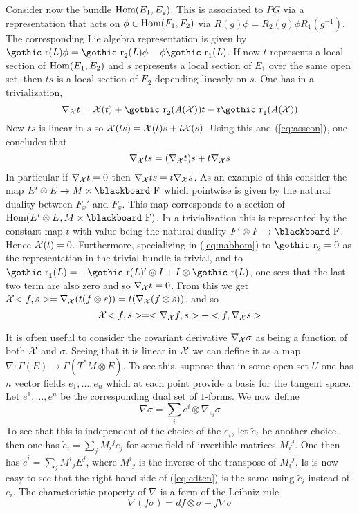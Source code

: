\documentclass[12pt,titlepage]{article}
\def\bbf#1{\hbox{\blackboard #1}}
\def\goth#1{\hbox{\gothic #1}}
\def\lF{\bbf F}
\def\cX{{\cal X}}
\def\gr{{\goth r}}
\def\Hom{\hbox{Hom}}
\begin{document}
Consider now the bundle \(\Hom(E_1,E_2)\). This is associated to \(PG\)
via a representation that acts on \(\phi\in\Hom(F_1,F_2)\) via
\(R(g)\phi = R_2(g)\phi R_1(g^{-1})\). The corresponding Lie algebra
representation is given by \(\gr(L)\phi = \gr_2(L)\phi - \phi\gr_1(L)\).
If now \(t\) represents a local section of \(\Hom(E_1,E_2)\) and \(s\)
represents a local section of \(E_1\) over the same open set, then
\(ts\) is a local section of \(E_2\) depending linearly on \(s\).
One has in a  trivialization,
\begin{equation}\label{eq:nabhom}%
\nabla_\cX t=\cX(t)+ \gr_2(A (\cX))t-t\gr_1(A (\cX))
\end{equation}%
Now
\(ts\) is linear in \(s\) so \(\cX(ts)=\cX(t)s + t\cX(s)\).
Using this and (\ref{eq:asscon}), one concludes that
\begin{equation}\label{eq:cdts}
\nabla_\cX ts =(\nabla_\cX t)s+t\nabla_\cX s
\end{equation}
In particular if
\(\nabla_\cX t=0\)
then \(\nabla_\cX ts = t\nabla_\cX s\).  As an example of this consider
the map \(E'\otimes E \to M\times \lF\) which pointwise is given by the
natural duality between \(F_x'\) and \(F_x\). This map corresponds to a
section of \(\Hom(E'\otimes E, M\times \lF)\). In a 
trivialization this is represented by the constant map \(t\)
with value being the natural duality \(F'\otimes F\to \lF\). Hence
\(\cX(t)=0\). Furthermore, specializing in (\ref{eq:nabhom}) to
\(\gr_2=0\) as the representation in the trivial bundle is trivial,
and to \(\gr_1(L)=-\gr(L)'\otimes I + I\otimes\gr(L)\), 
 one sees that the
last two term are also zero and so
 \(\nabla_\cX t=0\). From this we get
 \(\cX\!<f,s>=\nabla_\cX (t(f\otimes s)) =
t(\nabla_\cX(f\otimes s))\), and so \[
\cX\!<f,s> =
<\nabla_\cX f,s> + <f,\nabla_\cX s>
\]



It is often useful to consider the covariant derivative
\(\nabla_\cX\sigma\) as being a function of both \(\cX\) and \(\sigma\).
Seeing that it is linear in \(\cX\)  we can define it as a
map \(\nabla:\Gamma(E)\to\Gamma(T^*M\otimes E)\). 
%
To see this, suppose that in some open set \(U\) one has  \(n\)
 vector
fields \(e_1,\dots,e_n\) which at each point provide a basis for the
tangent space. Let \(e^1,\dots,e^n\) be the corresponding dual set
of \(1\)-forms. We now define 
 \begin{equation}\label{eq:cdten}%
\nabla\sigma=\sum_ie^i\otimes\nabla_{e_i}\sigma
\end{equation}%
To see that this is independent of the choice of the \(e_i\), let
\(\tilde e_i\) be another choice, then one has 
\(\tilde e_i=\sum_jM_i{}^je_j\) for some field of invertible matrices
\(M_i{}^j\). One then has \(\tilde e^i = \sum_jM^i{}_jE^j\), where
\(M^i{}_j\) is the inverse of the transpose of \(M_i{}^j\). 
Is is now easy to see
that the right-hand side of (\ref{eq:cdten}) is the same using 
\(\tilde e_i\) instead of \(e_i\).
The characteristic property of
\(\nabla\) is a form of the Leibniz rule
\[
\nabla(f\sigma)=df\otimes\sigma+f\nabla\sigma
\]
\end{document}
